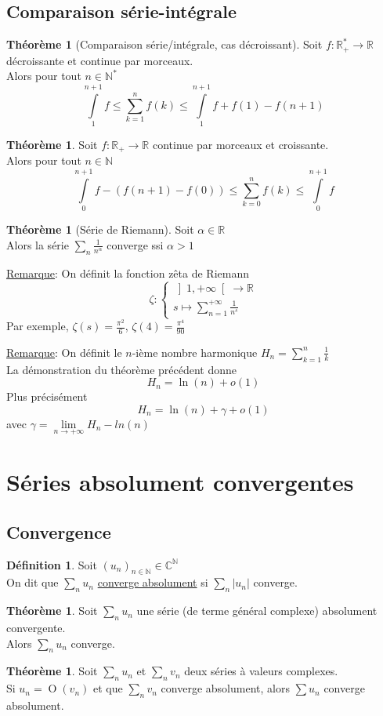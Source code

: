 \documentclass[10pt,a4paper]{article}
\theoremstyle{definition}
\newtheorem{theorem}[proposition]{Théorème}
\newtheorem{definition}[proposition]{Définition}
\DeclareMathOperator*{\dom}{O}
\begin{document}
\subsection{Comparaison série-intégrale}
\begin{theorem}[Comparaison série/intégrale, cas décroissant]
Soit $f: \mathbb{R}_+^* \to \mathbb{R}$ décroissante et continue par morceaux. \\
Alors pour tout $n \in \mathbb{N}^*$
\[\int\limits_1^{n + 1}f \leq \sum_{k = 1}^n f(k) \leq \int\limits_1^{n + 1}f + f(1) - f(n+1)\]
\end{theorem}
\begin{theorem}
Soit $f: \mathbb{R}_+ \to \mathbb{R}$ continue par morceaux et croissante. \\
Alors pour tout $n \in \mathbb{N}$
\[\int\limits_{0}^{n + 1} f - ( f(n + 1) - f(0)) \leq \sum_{k = 0}^n f(k) \leq \int\limits_{0}^{n + 1} f\]
\end{theorem}
\begin{theorem}[Série de Riemann]
Soit $\alpha \in \mathbb{R}$ \\
Alors la série $\sum\limits_n \frac{1}{n^\alpha}$ converge ssi $\alpha > 1$
\end{theorem}
\noindent \uline{Remarque}: On définit la fonction zêta de Riemann
\[ \zeta: \begin{cases}
\left] 1, +\infty \right[ \to \mathbb{R} \\
s \mapsto \sum\limits_{n = 1}^{+\infty} \frac{1}{n^s}
\end{cases} \]
Par exemple, $\zeta(s) = \frac{\pi^2}{6}$, $\zeta(4) = \frac{\pi^4}{90}$ \medskip

\noindent \uline{Remarque}: On définit le $n$-ième nombre harmonique $H_n = \sum\limits_{k = 1}^n \frac{1}{k}$ \\
La démonstration du théorème précédent donne
\[ H_n = \ln(n) + o(1)\]
Plus précisément
\[ H_n = \ln(n) + \gamma + o(1)\]
avec $\gamma = \lim\limits_{n \to +\infty} H_n - ln(n)$

\section{Séries absolument convergentes}
\subsection{Convergence}
\begin{definition}
Soit $(u_n)_{n \in \mathbb{N}} \in \mathbb{C}^\mathbb{N}$ \\
On dit que $\sum\limits_n u_n$ \uline{converge absolument} si $\sum\limits_n |u_n|$ converge.
\end{definition}
\begin{theorem}
Soit $\sum\limits_n u_n$ une série (de terme général complexe) absolument convergente. \\
Alors $\sum\limits_n u_n$ converge.
\end{theorem}
\begin{theorem}
Soit $\sum\limits_n u_n$ et $\sum\limits_n v_n$ deux séries à valeurs complexes. \\
Si $u_n = \dom(v_n)$ et que $\sum\limits_n v_n$ converge absolument, alors $\sum u_n$ converge absolument.
\end{theorem}
\end{document}
